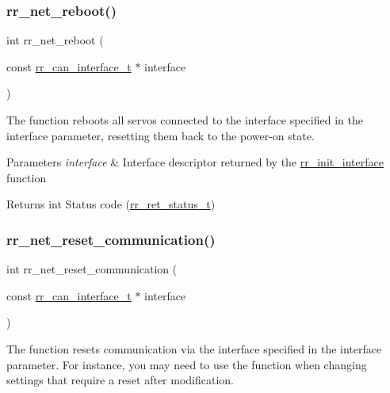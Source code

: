 \subsubsection{\texorpdfstring{rr\+\_\+net\+\_\+reboot()}{rr\_net\_reboot()}}
{\footnotesize\ttfamily int rr\+\_\+net\+\_\+reboot (\begin{DoxyParamCaption}\item[{const \hyperlink{structrr__can__interface__t}{rr\+\_\+can\+\_\+interface\+\_\+t} $\ast$}]{interface }\end{DoxyParamCaption})}



The function reboots all servos connected to the interface specified in the \textquotesingle{}interface\textquotesingle{} parameter, resetting them back to the power-\/on state. 


\begin{DoxyParams}{Parameters}
{\em interface} & Interface descriptor returned by the \hyperlink{group___init_ga472a4890dcc7d7a13123c56a06946d91}{rr\+\_\+init\+\_\+interface} function \\
\hline
\end{DoxyParams}
\begin{DoxyReturn}{Returns}
int Status code (\hyperlink{api_8h_a92d5be5038abcf89837faf85a08debdc}{rr\+\_\+ret\+\_\+status\+\_\+t}) 
\end{DoxyReturn}
\mbox{\label{group___state_ga7591c01ec4b20388fad7effe3266e3b1}} 
\subsubsection{\texorpdfstring{rr\+\_\+net\+\_\+reset\+\_\+communication()}{rr\_net\_reset\_communication()}}
{\footnotesize\ttfamily int rr\+\_\+net\+\_\+reset\+\_\+communication (\begin{DoxyParamCaption}\item[{const \hyperlink{structrr__can__interface__t}{rr\+\_\+can\+\_\+interface\+\_\+t} $\ast$}]{interface }\end{DoxyParamCaption})}



The function resets communication via the interface specified in the \textquotesingle{}interface\textquotesingle{} parameter. For instance, you may need to use the function when changing settings that require a reset after modification. 


